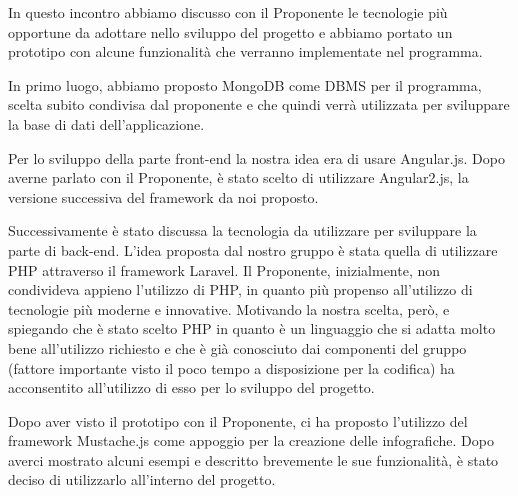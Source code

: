 In questo incontro abbiamo discusso con il Proponente le tecnologie più opportune da adottare nello sviluppo del progetto e abbiamo portato un \gls{prototipo} con alcune funzionalità che verranno implementate nel programma.

\noindent In primo luogo, abbiamo proposto \gls{MongoDB} come \gls{DBMS} per il programma, scelta subito condivisa dal proponente e che quindi verrà utilizzata per sviluppare la base di dati dell'applicazione.

\noindent Per lo sviluppo della parte \gls{front-end} la nostra idea era di usare \gls{Angular.js}. Dopo averne parlato con il Proponente, è stato scelto di utilizzare Angular2.js, la versione successiva del \gls{framework} da noi proposto.

\noindent Successivamente è stato discussa la tecnologia da utilizzare per sviluppare la parte di \gls{back-end}. L'idea proposta dal nostro gruppo è stata quella di utilizzare \gls{PHP} attraverso il \gls{framework} \gls{Laravel}. Il Proponente, inizialmente, non condivideva appieno l'utilizzo di \gls{PHP}, in quanto più propenso all'utilizzo di tecnologie più moderne e innovative. Motivando la nostra scelta, però, e spiegando che è stato scelto \gls{PHP} in quanto è un linguaggio che si adatta molto bene all'utilizzo richiesto e che è già conosciuto dai componenti del gruppo (fattore importante visto il poco tempo a disposizione per la codifica) ha acconsentito all'utilizzo di esso per lo sviluppo del progetto.

\noindent Dopo aver visto il \gls{prototipo} con il Proponente, ci ha proposto l'utilizzo del \gls{framework} \gls{Mustache.js} come appoggio per la creazione delle \gls{infografiche}. Dopo averci mostrato alcuni esempi e descritto brevemente le sue funzionalità, è stato deciso di utilizzarlo all'interno del progetto.
